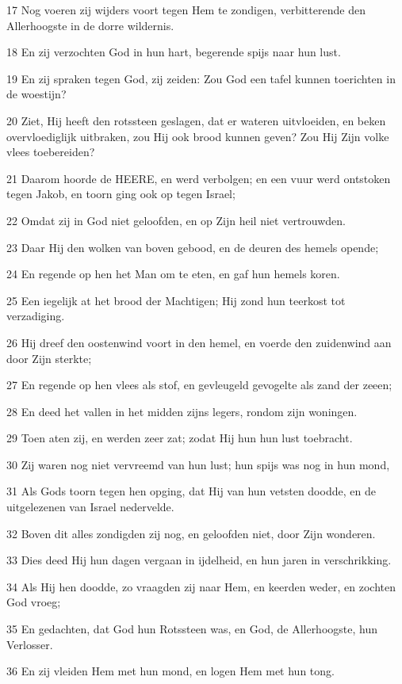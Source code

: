 \par 17 Nog voeren zij wijders voort tegen Hem te zondigen, verbitterende den Allerhoogste in de dorre wildernis.
\par 18 En zij verzochten God in hun hart, begerende spijs naar hun lust.
\par 19 En zij spraken tegen God, zij zeiden: Zou God een tafel kunnen toerichten in de woestijn?
\par 20 Ziet, Hij heeft den rotssteen geslagen, dat er wateren uitvloeiden, en beken overvloediglijk uitbraken, zou Hij ook brood kunnen geven? Zou Hij Zijn volke vlees toebereiden?
\par 21 Daarom hoorde de HEERE, en werd verbolgen; en een vuur werd ontstoken tegen Jakob, en toorn ging ook op tegen Israel;
\par 22 Omdat zij in God niet geloofden, en op Zijn heil niet vertrouwden.
\par 23 Daar Hij den wolken van boven gebood, en de deuren des hemels opende;
\par 24 En regende op hen het Man om te eten, en gaf hun hemels koren.
\par 25 Een iegelijk at het brood der Machtigen; Hij zond hun teerkost tot verzadiging.
\par 26 Hij dreef den oostenwind voort in den hemel, en voerde den zuidenwind aan door Zijn sterkte;
\par 27 En regende op hen vlees als stof, en gevleugeld gevogelte als zand der zeeen;
\par 28 En deed het vallen in het midden zijns legers, rondom zijn woningen.
\par 29 Toen aten zij, en werden zeer zat; zodat Hij hun hun lust toebracht.
\par 30 Zij waren nog niet vervreemd van hun lust; hun spijs was nog in hun mond,
\par 31 Als Gods toorn tegen hen opging, dat Hij van hun vetsten doodde, en de uitgelezenen van Israel nedervelde.
\par 32 Boven dit alles zondigden zij nog, en geloofden niet, door Zijn wonderen.
\par 33 Dies deed Hij hun dagen vergaan in ijdelheid, en hun jaren in verschrikking.
\par 34 Als Hij hen doodde, zo vraagden zij naar Hem, en keerden weder, en zochten God vroeg;
\par 35 En gedachten, dat God hun Rotssteen was, en God, de Allerhoogste, hun Verlosser.
\par 36 En zij vleiden Hem met hun mond, en logen Hem met hun tong.
